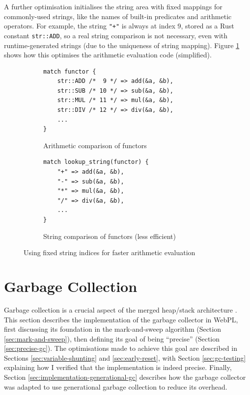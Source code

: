A further optimisation initialises the string area with fixed mappings for commonly-used strings, like the names of built-in predicates and arithmetic operators. For example, the string \texttt{"+"} is always at index 9, stored as a Rust constant \texttt{str::ADD}, so a real string comparison is not necessary, even with runtime-generated strings (due to the uniqueness of string mapping). Figure \ref{fig:fixed-string-indices} shows how this optimises the arithmetic evaluation code (simplified).

\begin{figure}[H]
\centering
\begin{subfigure}{.5\textwidth}
\centering
\begin{verbatim}
match functor {
    str::ADD /*  9 */ => add(&a, &b),
    str::SUB /* 10 */ => sub(&a, &b),
    str::MUL /* 11 */ => mul(&a, &b),
    str::DIV /* 12 */ => div(&a, &b),
    ...
}
\end{verbatim}
\caption{Arithmetic comparison of functors}
\end{subfigure}%
\begin{subfigure}{.5\textwidth}
\centering
\begin{verbatim}
match lookup_string(functor) {
    "+" => add(&a, &b),
    "-" => sub(&a, &b),
    "*" => mul(&a, &b),
    "/" => div(&a, &b),
    ...
}
\end{verbatim}
\caption{String comparison of functors (less efficient)}
\end{subfigure}
\caption{Using fixed string indices for faster arithmetic evaluation}
\label{fig:fixed-string-indices}
\end{figure}

\newpage

\section{Garbage Collection}

\label{sec:gc-impl}

Garbage collection is a crucial aspect of the merged heap/stack architecture \cite{liEfficientMemoryManagement2000}. This section describes the implementation of the garbage collector in WebPL, first discussing its foundation in the mark-and-sweep algorithm (Section \ref{sec:mark-and-sweep}), then defining its goal of being ``precise'' (Section \ref{sec:precise-gc}). The optimisations made to achieve this goal are described in Sections \ref{sec:variable-shunting} and \ref{sec:early-reset}, with Section \ref{sec:gc-testing} explaining how I verified that the implementation is indeed precise. Finally, Section \ref{sec:implementation-generational-gc} describes how the garbage collector was adapted to use generational garbage collection to reduce its overhead.

